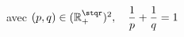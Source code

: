 \documentclass[preview]{standalone}
\begin{document}
\begin{center}
avec \((p, q)\in (\mathbb{R}_{+}^{\stqr})^2,\quad \dfrac{1}{p} + \dfrac{1}{q} = 1\)
\end{center}
\end{document}
